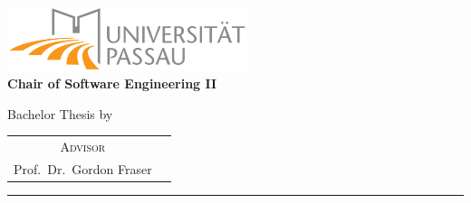 \begin{titlepage}
    \centering
    \begin{onehalfspace}
    
        	\includegraphics[width=7cm]{uni-logo.png}\\
        	\vspace{1.0cm}
        	\large {\bfseries Chair of Software Engineering II} \\

        	\vspace{2.5cm}

            \begin{doublespace}
            	{\textsf{\Huge{\thetitle}}}
            \end{doublespace}

        	\vspace{2cm}

            \Large{Bachelor Thesis by}\\

        	\vspace{1cm}

        	{\bfseries \large{\theauthor}}

        	\vfill

        	{\large
        		\begin{tabular}[l]{cc}
        			\textsc{Advisor}\\
        			Prof.~Dr.~Gordon Fraser
        		\end{tabular}
        	}

        	\vspace{1.5cm}

        	\parbox{\linewidth}{\hrule\strut}

            \vfill

	    {\thedate}
    	
    \end{onehalfspace}
\end{titlepage}

